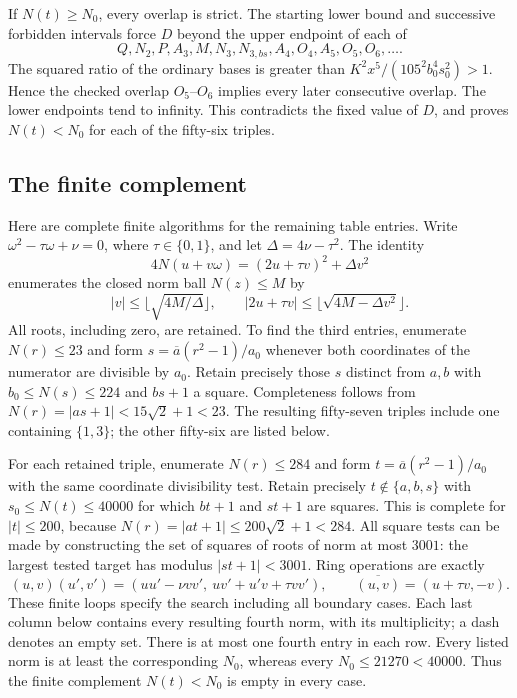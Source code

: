 \documentclass[12pt]{article}
\numberwithin{equation}{section}
\begin{document}
If $N(t)\ge N_0$, every overlap is strict. The starting lower bound
and successive forbidden intervals force $D$ beyond the upper endpoint
of each of
\[
 Q,N_2,P,A_3,M,N_3,N_{3,bs},A_4,O_4,A_5,O_5,O_6,\ldots.
\]
The squared ratio of the ordinary bases is greater than
$K^2x^5/(105^2b_0^4s_0^2)>1$. Hence the checked overlap
$O_5$--$O_6$ implies every later consecutive overlap. The lower
endpoints tend to infinity. This contradicts the fixed value of $D$,
and proves $N(t)<N_0$ for each of the fifty-six triples.

\subsection{The finite complement}

Here are complete finite algorithms for the remaining table entries.
Write $\omega^2-\tau\omega+\nu=0$, where $\tau\in\{0,1\}$,
and let $\Delta=4\nu-\tau^2$. The identity
\[
 4N(u+v\omega)=(2u+\tau v)^2+\Delta v^2
\]
enumerates the closed norm ball $N(z)\le M$ by
\[
 |v|\le\lfloor\sqrt{4M/\Delta}\rfloor,\qquad
 |2u+\tau v|\le\lfloor\sqrt{4M-\Delta v^2}\rfloor.
\]
All roots, including zero, are retained. To find the third entries,
enumerate $N(r)\le23$ and form
$s=\overline a(r^2-1)/a_0$ whenever both coordinates of the numerator
are divisible by $a_0$. Retain precisely those $s$ distinct from $a,b$
with $b_0\le N(s)\le224$ and $bs+1$ a square.
Completeness follows from $N(r)=|as+1|<15\sqrt2+1<23$.
The resulting fifty-seven triples include one containing $\{1,3\}$;
the other fifty-six are listed below.

For each retained triple, enumerate $N(r)\le284$ and form
$t=\overline a(r^2-1)/a_0$ with the same coordinate divisibility test.
Retain precisely $t\notin\{a,b,s\}$ with $s_0\le N(t)\le40000$
for which $bt+1$ and $st+1$ are squares.
This is complete for $|t|\le200$, because
$N(r)=|at+1|\le200\sqrt2+1<284$.
All square tests can be made by constructing the set of squares of
roots of norm at most $3001$: the largest tested target has modulus
$|st+1|<3001$. Ring operations are exactly
\[
 (u,v)(u',v')=(uu'-\nu vv',\ uv'+u'v+\tau vv'),\qquad
 \overline{(u,v)}=(u+\tau v,-v).
\]
These finite loops specify the search including all boundary cases.
Each last column below contains every resulting fourth norm, with
its multiplicity; a dash denotes an empty set. There is at most one
fourth entry in each row. Every listed norm is at least the corresponding
$N_0$, whereas every $N_0\le21270<40000$.
Thus the finite complement $N(t)<N_0$ is empty in every case.
\end{document}
